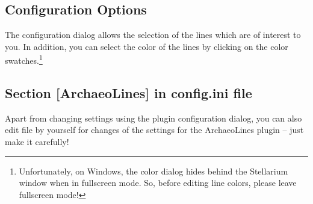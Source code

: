 \subsection{Configuration Options}
\label{sec:plugin:ArchaeoLines:configuration}

The configuration dialog allows the selection of the lines which are
of interest to you. 
%
%
In addition, you can select the color of the lines by clicking on the
color swatches.\footnote{Unfortunately, on Windows, the color dialog hides
behind the Stellarium window when in fullscreen mode. So, before
editing line colors, please leave fullscreen mode!}

\subsection*{Section [ArchaeoLines] in config.ini file}

Apart from changing settings using the plugin configuration dialog,
you can also edit  file by yourself for changes of the
settings for the ArchaeoLines plugin -- just make it carefully!

